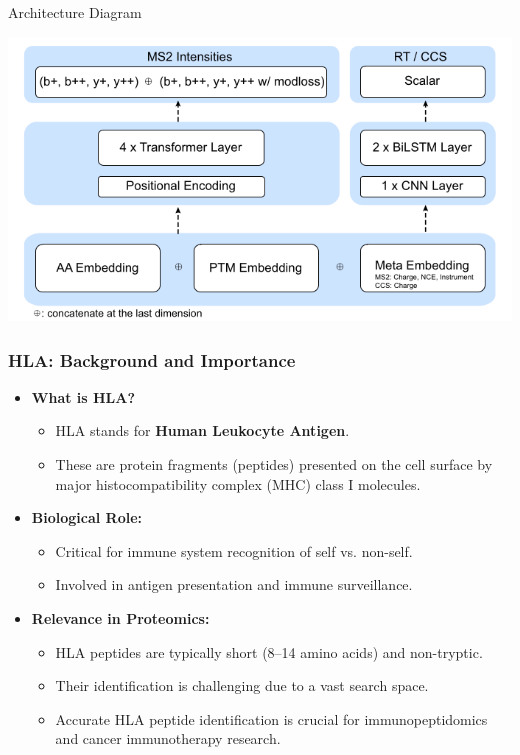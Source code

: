 \documentclass{beamer}
\begin{document}
\begin{frame}{Architecture Diagram}
 \begin{center}
    \includegraphics[width=\textwidth]{Screenshot from 2025-03-12 20-33-16.png}
  \end{center}
    
\end{frame}
\begin{frame}
  \frametitle{HLA: Background and Importance}
  \begin{itemize}
    \item \textbf{What is HLA?}
      \begin{itemize}
        \item HLA stands for \textbf{Human Leukocyte Antigen}.
        \item These are protein fragments (peptides) presented on the cell surface by major histocompatibility complex (MHC) class I molecules.
      \end{itemize}
    \item \textbf{Biological Role:}
      \begin{itemize}
        \item Critical for immune system recognition of self vs. non-self.
        \item Involved in antigen presentation and immune surveillance.
      \end{itemize}
    \item \textbf{Relevance in Proteomics:}
      \begin{itemize}
        \item HLA peptides are typically short (8--14 amino acids) and non-tryptic.
        \item Their identification is challenging due to a vast search space.
        \item Accurate HLA peptide identification is crucial for immunopeptidomics and cancer immunotherapy research.
      \end{itemize}
  \end{itemize}
\end{frame}
\end{document}
